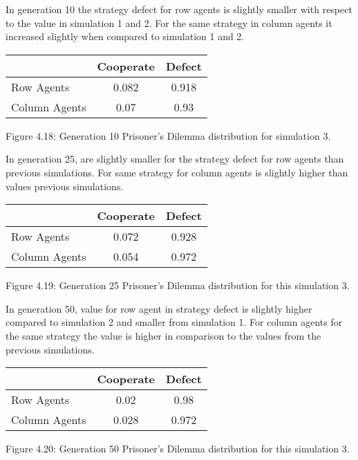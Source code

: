 \documentclass{article}
\begin{document}
In generation 10 the strategy defect for row agents is slightly smaller with respect to the value in simulation 1 and 2. For the same strategy in column agents it increased slightly when compared to simulation 1 and 2.
\begin{center}
\begin{tabular}{|l|c|c|}
\hline
& Cooperate & Defect \\ 
\hline
Row Agents & 0.082 & 0.918\\
\hline
Column Agents & 0.07 & 0.93\\
\hline
\end{tabular}
\end{center}
\begin{center}
Figure 4.18: Generation 10 Prisoner’s Dilemma distribution for simulation 3.
\end{center}

In generation 25, are slightly smaller for the strategy defect for row agents than previous simulations. For same strategy for column agents is slightly higher than values previous simulations.
\begin{center}
\begin{tabular}{|l|c|c|}
\hline
& Cooperate & Defect \\ 
\hline
Row Agents & 0.072 & 0.928\\
\hline
Column Agents & 0.054 & 0.972\\
\hline
\end{tabular}
\end{center}
\begin{center}
Figure 4.19: Generation 25 Prisoner’s Dilemma distribution for this simulation 3.
\end{center}


In generation 50, value for row agent in strategy defect is slightly higher compared to simulation 2  and smaller from simulation 1. For column agents for the same strategy the value is higher in comparison to the values from the previous simulations.
\begin{center}
\begin{tabular}{|l|c|c|}
\hline
& Cooperate & Defect \\ 
\hline
Row Agents & 0.02 & 0.98\\
\hline
Column Agents & 0.028 & 0.972\\
\hline
\end{tabular}
\end{center}
\begin{center}
Figure 4.20: Generation 50 Prisoner’s Dilemma distribution for this simulation 3.
\end{center}
\end{document}
